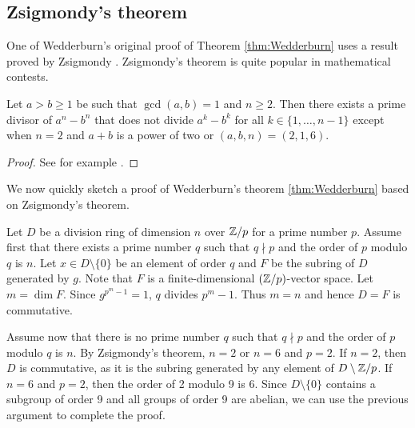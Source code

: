 \subsection{Zsigmondy's theorem}

One of Wedderburn's original proof of Theorem \ref{thm:Wedderburn} 
uses a 
result proved
by Zsigmondy \cite{MR1546236}. Zsigmondy's theorem is 
quite popular in mathematical contests. 


\begin{theorem}[Zsigmondy]
    Let $a>b\geq1$ be such that $\gcd(a,b)=1$ and $n\geq2$. 
    Then there exists a prime divisor of $a^n-b^n$ that does not
    divide $a^k-b^k$ for all $k\in\{1,\dots,n-1\}$ except 
    when $n=2$ and $a+b$ is a power of two or $(a,b,n)=(2,1,6)$. 
\end{theorem}


\begin{proof}
    See for example \cite{MR3172590}. 
\end{proof}

We now quickly sketch a proof of Wedderburn's theorem \ref{thm:Wedderburn} 
based on Zsigmondy's theorem.  

Let $D$ be a division ring of dimension $n$ over $\mathbb{Z}/p$ for a prime
number $p$. Assume 
first that there exists a prime number $q$ such that 
$q\nmid p$ and the order of $p$ modulo $q$ is $n$. Let $x\in D\setminus\{0\}$ be an element of order $q$ and $F$ be the subring
of $D$ generated by $g$. Note that $F$ is a finite-dimensional
$(\mathbb{Z}/p)$-vector space. Let $m=\dim F$. 
Since $g^{p^m-1}=1$, $q$ divides $p^m-1$. Thus $m=n$ and
hence $D=F$ is commutative. 

Assume now that there is no prime number $q$ such that 
$q\nmid p$ and the order of $p$ modulo $q$ is $n$. By Zsigmondy's 
theorem, $n=2$ or $n=6$ and $p=2$. If $n=2$, then 
$D$ is commutative, as it is the subring generated by
any element of $D\setminus \mathbb{Z}/p$. If $n=6$ and $p=2$, then 
the order of 2 modulo 9 is 6. Since $D\setminus\{0\}$ contains
a subgroup of order 9 and all groups of order 9 are abelian, 
we can use the previous argument to complete the proof. 


